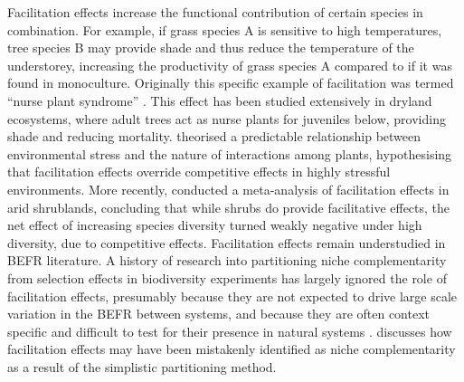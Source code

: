 \begin{refsection}
Facilitation effects increase the functional contribution of certain species in combination. For example, if grass species A is sensitive to high temperatures, tree species B may provide shade and thus reduce the temperature of the understorey, increasing the productivity of grass species A compared to if it was found in monoculture. Originally this specific example of facilitation was termed ``nurse plant syndrome'' \citep{Padilla2006}. This effect has been studied extensively in dryland ecosystems, where adult trees act as nurse plants for juveniles below, providing shade and reducing mortality. \citet{Callaway1997, Good2014, Weltzin1999} theorised a predictable relationship between environmental stress and the nature of interactions among plants, hypothesising that facilitation effects override competitive effects in highly stressful environments. More recently, \citet{Lortie2021} conducted a meta-analysis of facilitation effects in arid shrublands, concluding that while shrubs do provide facilitative effects, the net effect of increasing species diversity turned weakly negative under high diversity, due to competitive effects. Facilitation effects remain understudied in BEFR literature. A history of research into partitioning niche complementarity from selection effects in biodiversity experiments has largely ignored the role of facilitation effects, presumably because they are not expected to drive large scale variation in the BEFR between systems, and because they are often context specific and difficult to test for their presence in natural systems \citep{Wright2017}. \citet{Wright2021} discusses how facilitation effects may have been mistakenly identified as niche complementarity as a result of the simplistic partitioning method.


\end{refsection}
